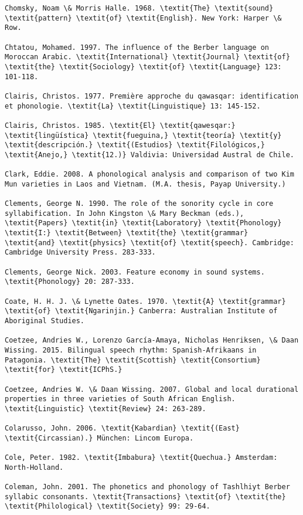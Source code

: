 \begin{verbatim}
Chomsky, Noam \& Morris Halle. 1968. \textit{The} \textit{sound} \textit{pattern} \textit{of} \textit{English}. New York: Harper \& Row.

Chtatou, Mohamed. 1997. The influence of the Berber language on Moroccan Arabic. \textit{International} \textit{Journal} \textit{of} \textit{the} \textit{Sociology} \textit{of} \textit{Language} 123: 101-118.

Clairis, Christos. 1977. Première approche du qawasqar: identification et phonologie. \textit{La} \textit{Linguistique} 13: 145-152.

Clairis, Christos. 1985. \textit{El} \textit{qawesqar:} \textit{lingüística} \textit{fueguina,} \textit{teoría} \textit{y} \textit{descripción.} \textit{(Estudios} \textit{Filológicos,} \textit{Anejo,} \textit{12.)} Valdivia: Universidad Austral de Chile.

Clark, Eddie. 2008. A phonological analysis and comparison of two Kim Mun varieties in Laos and Vietnam. (M.A. thesis, Payap University.)

Clements, George N. 1990. The role of the sonority cycle in core syllabification. In John Kingston \& Mary Beckman (eds.), \textit{Papers} \textit{in} \textit{Laboratory} \textit{Phonology} \textit{I:} \textit{Between} \textit{the} \textit{grammar} \textit{and} \textit{physics} \textit{of} \textit{speech}. Cambridge: Cambridge University Press. 283-333.

Clements, George Nick. 2003. Feature economy in sound systems. \textit{Phonology} 20: 287-333.

Coate, H. H. J. \& Lynette Oates. 1970. \textit{A} \textit{grammar} \textit{of} \textit{Ngarinjin.} Canberra: Australian Institute of Aboriginal Studies.

Coetzee, Andries W., Lorenzo García-Amaya, Nicholas Henriksen, \& Daan Wissing. 2015. Bilingual speech rhythm: Spanish-Afrikaans in Patagonia. \textit{The} \textit{Scottish} \textit{Consortium} \textit{for} \textit{ICPhS.}

Coetzee, Andries W. \& Daan Wissing. 2007. Global and local durational properties in three varieties of South African English. \textit{Linguistic} \textit{Review} 24: 263-289.

Colarusso, John. 2006. \textit{Kabardian} \textit{(East} \textit{Circassian).} München: Lincom Europa.

Cole, Peter. 1982. \textit{Imbabura} \textit{Quechua.} Amsterdam: North-Holland.

Coleman, John. 2001. The phonetics and phonology of Tashlhiyt Berber syllabic consonants. \textit{Transactions} \textit{of} \textit{the} \textit{Philological} \textit{Society} 99: 29-64.


\end{verbatim}
